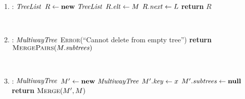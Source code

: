\documentclass[11pt]{article}
\newcommand{\id}[1]{\mbox{\textit{#1}}}
\begin{document}
\begin{enumerate}
\item
\begin{algorithmic}[1]
 : $\id{TreeList}$
    \State $R \gets \mathbf{new}\ \id{TreeList}$
    \State $R.\id{elt} \gets M$
    \State $R.\id{next} \gets L$
    \State \textbf{return} $R$
\EndFunction
\end{algorithmic}

~

\item
\begin{algorithmic}[1]
     : $\id{MultiwayTree}$
            \State \textsc{Error}(``Cannot delete from empty tree'')
        \EndIf
        \State \textbf{return} $\textsc{MergePairs}(M.\id{subtrees})$
    \EndFunction
\end{algorithmic}

~

\item
\begin{algorithmic}[1]
     : $\id{MultiwayTree}$
        \State $M' \gets \mathbf{new}\ \id{MultiwayTree}$
        \State $M'.\id{key} \gets x$
        \State $M'.\id{subtrees} \gets \mathbf{null}$
        \State \textbf{return} $\textsc{Merge}(M',M)$
    \EndFunction
\end{algorithmic}
\end{enumerate}
\end{document}
